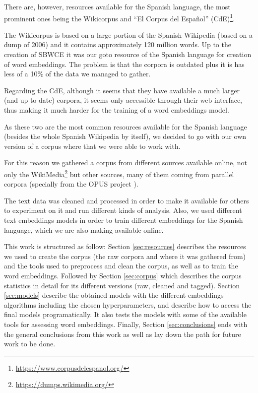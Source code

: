 \documentclass{article}
\begin{document}
There are, however, resources available for the Spanish language, the most
prominent ones being the Wikicorpus \cite{DBLP:conf/lrec/ReeseBCPR10} and ``El
Corpus del Espa\~nol'' (CdE)\footnote{\url{https://www.corpusdelespanol.org/}}.

The Wikicorpus is based on a large portion of the Spanish Wikipedia (based on a
dump of 2006) and it contains approximately 120 million words. Up to the
creation of SBWCE it was our goto resource of the Spanish language for creation
of word embeddings. The problem is that the corpora is outdated plus it is has
less of a 10\% of the data we managed to gather.

Regarding the CdE, although it seems that they have available a much larger
(and up to date) corpora, it seems only accessible through their web interface,
thus making it much harder for the training of a word embeddings model.

As these two are the most common resources available for the Spanish language
(besides the whole Spanish Wikipedia by itself), we decided to go with our own
version of a corpus where that we were able to work with.

For this reason we gathered a corpus from different sources available online,
not only the WikiMedia\footnote{\url{https://dumps.wikimedia.org/}} but other
sources, many of them coming from parallel corpora (specially from the OPUS
project \cite{TIEDEMANN12.463}).

The text data was cleaned and processed in order to make it available for
others to experiment on it and run different kinds of analysis. Also, we used
different text embeddings models in order to train different embeddings for the
Spanish language, which we are also making available online.

This work is structured as follow: Section \ref{sec:resources} describes the
resources we used to create the corpus (the raw corpora and where it was
gathered from) and the tools used to preprocess and clean the corpus, as well
as to train the word embeddings. Followed by Section \ref{sec:corpus} which
describes the corpus statistics in detail for its different versions (raw,
cleaned and tagged). Section \ref{sec:models} describe the obtained models with
the different embeddings algorithms including the chosen hyperparameters, and
describe how to access the final models programatically. It also tests the
models with some of the available tools for assessing word embeddings. Finally,
Section \ref{sec:conclusions} ends with the general conclusions from this work
as well as lay down the path for future work to be done.
\end{document}
